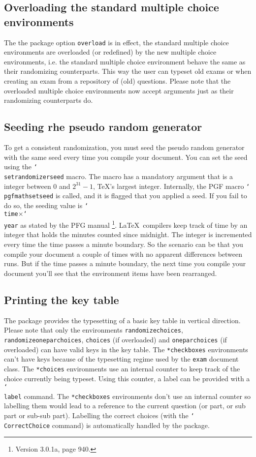 \documentclass[12pt,a4paper]{exam}
\providecommand{\texorpdfstring}[2]{#1}
\newcommand{\bs}{\texorpdfstring{\char`\\}{}}
\begin{document}
\subsection{Overloading the standard multiple choice environments}
The the package option \texttt{overload} is in effect, the standard multiple choice
environments are overloaded (or redefined) by the new multiple choice environments,
i.e. the standard multiple choice environment behave the same as their
randomizing counterparts. This way the user can typeset old exams or when creating
an exam from a repository of (old) questions. Please note that the overloaded
multiple choice environments now accept arguments just as their randomizing
counterparts do.


\subsection{Seeding rhe pseudo random generator}
\label{sec:seeding}
To get a consistent randomization, you must seed the pseudo random generator
with the same seed every time you compile your document. You can set the
seed using the \texttt{\bs setrandomizerseed} macro. The macro has a mandatory
argument that is a integer between 0 and $2^{31}-1$, \TeX's largest integer.
Internally, the PGF macro \texttt{\bs pgfmathsetseed} is called, and it is
flagged that you applied a seed. If you fail to do so, the seeding value is
\texttt{\bs time}$\times$\texttt{\bs year} as stated by the PFG manual%
\footnote{Version 3.0.1a, page 940.}. \LaTeX\ compilers keep track of
time by an integer that holds the minutes counted since midnight. The integer is
incremented every time the time passes a minute boundary. So the scenario
can be that you compile your document a couple of times with no apparent
differences between runs. But if the time passes a minute boundary, the
next time you compile your document you'll see that the environment items
have been rearranged.

\subsection{Printing the key table}
The package provides the typesetting of a basic key table in vertical direction.
Please note that only the environments \texttt{randomizechoices},
\texttt{randomizeoneparchoices}, \texttt{choices} (if overloaded) and
\texttt{oneparchoices} (if overloaded) can have valid keys in the key table.
The \texttt{*checkboxes} environments can't 
have keys because of the typesetting regime used by the \texttt{exam}
document class. The \texttt{*choices} environments use an internal counter
to keep track of the choice currently being typeset. Using this counter, a
label can be provided with a \texttt{\bs label} command.
The \texttt{*checkboxes} environments don't use an internal counter so 
labelling them would lead to a reference to the current question (or part,
or sub part or sub-sub part). Labelling the correct choices (with the
\texttt{\bs CorrectChoice} command) is automatically handled by the
package.
\end{document}
